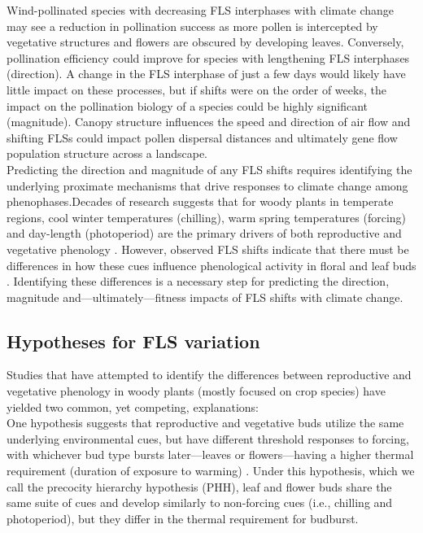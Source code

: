 \documentclass[11pt]{article}\usepackage[]{graphicx}\usepackage[]{color}
\begin{document}
\noindent Wind-pollinated species with decreasing FLS interphases with climate change may see a reduction in pollination success as more pollen is intercepted by vegetative structures and flowers are obscured by developing leaves. Conversely, pollination efficiency could improve for species with lengthening FLS interphases (direction). A change in the FLS interphase of just a few days would likely have little impact on these processes, but if shifts were on the order of weeks, the impact on the pollination biology of a species could be highly significant (magnitude). Canopy structure influences the speed and direction of air flow\citep{Niklas1985, Jackson:1999aa} and shifting FLSs could impact pollen dispersal distances \citep{Milleron2012} and ultimately gene flow population structure across a landscape.\\

\noindent Predicting the direction and magnitude of any FLS shifts requires identifying the underlying proximate mechanisms that drive responses to climate change among phenophases.Decades of research suggests that for woody plants in temperate regions, cool winter temperatures (chilling), warm spring temperatures (forcing) and day-length (photoperiod) are the primary drivers of both reproductive and vegetative phenology \citep{Forrest2010,Flynn2018}. However, observed FLS shifts indicate that there must be differences in how these cues influence phenological activity in floral and leaf buds \citep{Buonaiuto2020}.  Identifying these differences is a necessary step for predicting the direction, magnitude and---ultimately---fitness impacts of FLS shifts with climate change.\\ 

\subsection*{Hypotheses for FLS variation}

\noindent Studies that have attempted to identify the differences between reproductive and vegetative phenology in woody plants (mostly focused on crop species) have yielded two common, yet competing, explanations:\\

\noindent One hypothesis suggests that reproductive and vegetative buds utilize the same underlying environmental cues, but have different threshold responses to forcing, with whichever bud type bursts later---leaves or flowers---having a higher thermal requirement (duration of exposure to warming) \citep{Guo2014,COSMULESCU:2020aa,Cosmulescu:2018aa}. Under this hypothesis, which we call the precocity hierarchy hypothesis (PHH), leaf and flower buds share the same suite of cues and develop similarly to non-forcing cues (i.e., chilling and photoperiod), but they differ in the thermal requirement for budburst.\\
\end{document}
